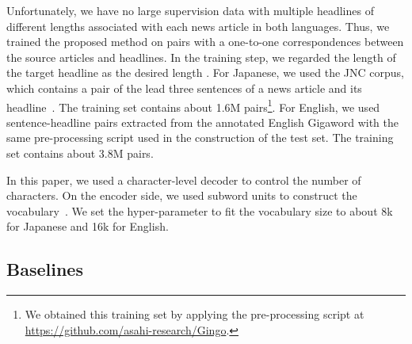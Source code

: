 \documentclass[11pt,a4paper]{article}
\begin{document}
Unfortunately, we have no large supervision data with multiple headlines of different lengths associated with each news article in both languages.
Thus, we trained the proposed method on pairs with a one-to-one correspondences between the source articles and headlines.
In the training step, we regarded the length of the target headline as the desired length .
For Japanese, we used the JNC corpus, which contains a pair of the lead three sentences of a news article and its headline~\cite{Hitomi2019}.
The training set contains about 1.6M pairs\footnote{We obtained this training set by applying the pre-processing script at \href{https://github.com/asahi-research/Gingo}{https://github.com/asahi-research/Gingo}.}.
For English, we used sentence-headline pairs extracted from the annotated English Gigaword with the same pre-processing script used in the construction of the test set.
The training set contains about 3.8M pairs.


In this paper, we used a character-level decoder to control the number of characters.
On the encoder side, we used subword units to construct the vocabulary~\cite{sennrich-haddow-birch:2016:P16-12,P18-1007}.
We set the hyper-parameter to fit the vocabulary size to about 8k for Japanese and 16k for English.




\subsection{Baselines}
\end{document}
